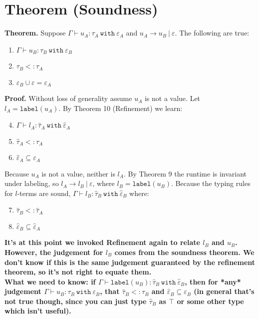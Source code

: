 \documentclass{llncs}
\newcommand{\keywadj}[1]{\mathtt{#1}}
\newcommand{\keyw}[1]{\keywadj{#1}~}
\newcommand{\kwa}[1]{\keywadj{ #1 }}
\newcommand{\type}[2]{
	#1~\keyw{with} #2
}
\begin{document}
\section{Theorem (Soundness)}

\textbf{Theorem.} Suppose $\Gamma \vdash u_A : \type{\tau_A}{\varepsilon_A}$ and $u_A \longrightarrow u_B~|~\varepsilon$. The following are true:
\begin{enumerate}
	\item $\Gamma \vdash u_B : \type{\tau_B}{\varepsilon_B}$
	\item $\tau_B <: \tau_A$
	\item $\varepsilon_B \cup \varepsilon = \varepsilon_A$
	\end{enumerate}

\noindent
\textbf{Proof.} Without loss of generality assume $u_A$ is not a value. Let $l_A = \kwa{label}(u_A)$. By Theorem 10 (Refinement) we learn:
\begin{enumerate}
  \setcounter{enumi}{3}
  \item $\Gamma \vdash l_A : \type{\hat \tau_A}{\hat \varepsilon_A}$
  \item $\hat \tau_A <: \tau_A$
  \item $\hat \varepsilon_A \subseteq \varepsilon_A$
\end{enumerate}
 
\noindent
Because $u_A$ is not a value, neither is $l_A$. By Theorem 9 the runtime is invariant under labeling, so $l_A \longrightarrow l_B~|~\varepsilon$, where $l_B = \kwa{label}(u_B)$. Because the typing rules for $l$-terms are sound, $\Gamma \vdash l_B : \type{\hat \tau_B}{\hat \varepsilon_B}$ where:

\begin{enumerate}
  \setcounter{enumi}{6}
	\item $\hat \tau_B <: \hat \tau_A$
	\item $\hat \varepsilon_B \subseteq \hat \varepsilon_A$
\end{enumerate}
 
\noindent
\textbf{It's at this point we invoked Refinement again to relate $l_B$ and $u_B$. However, the judgement for $l_B$ comes from the soundness theorem. We don't know if this is the same judgement guaranteed by the refinement theorem, so it's not right to equate them.}\\

\noindent
\textbf{What we need to know: if $\Gamma \vdash \kwa{label}(u_B) : \type{\hat \tau_B}{\hat \varepsilon_B}$, then for *any* judgement $\Gamma \vdash u_B : \type{\tau_B}{\varepsilon_B}$, that $\hat \tau_B <: \tau_B$ and $\hat \varepsilon_B \subseteq \varepsilon_B$ (in general that's not true though, since you can just type $\hat \tau_B$ as $\top$ or some other type which isn't useful). }
\end{document}
